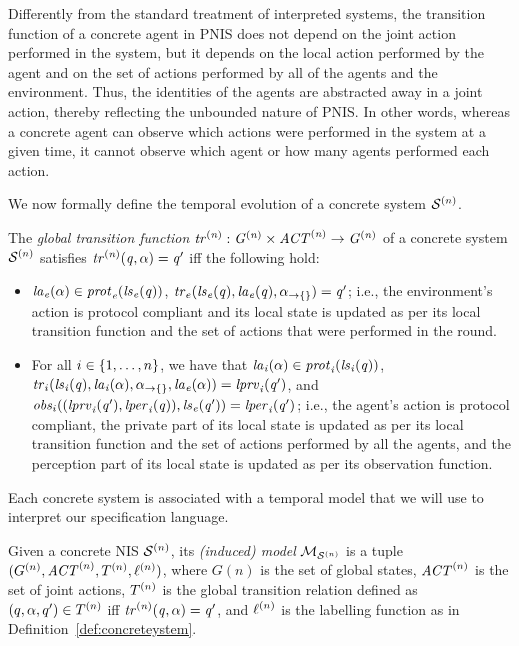 Differently from the standard treatment of interpreted systems, the
transition function of a concrete agent in PNIS  does not depend on the joint
action performed in the system, but it depends on the local action performed by
the  agent and on the set of actions performed by all of the agents
and the environment.  Thus, the identities of the agents are abstracted away in
a joint action, thereby reflecting the unbounded nature of PNIS. In other words,
whereas  a concrete agent can observe which actions were performed in the system
at a given time,  it cannot observe which agent or how many agents performed
each action.

We now formally define the temporal evolution of a concrete system
$\mathcal{S}^{(n)}$.



\begin{definition} 
  \label{def:globaltransition}
  The {\em global transition function} $\it{tr}^{(n)} : G^{(n)}
  \times \mathit{ACT}^{(n)} \rightarrow G^{(n)}$ of a concrete system $\mathcal{S}^{(n)}$
  satisfies $\it{tr}^{(n)}(q, \alpha) = q'$ iff the following hold:
  \begin{itemize}[$\bullet$]
  \item $\it{la}_{e}({\alpha}) \in \mathit{prot}_{e}({\it{ls}_{e}(q)})$, $\mathit{tr}_{e}(\it{ls}_{e}(q),
  \it{la}_{e}({q}), \alpha_{\rightarrow\{\}}) = q'$; i.e., the environment’s action is
  protocol compliant and its local state is updated as per its local transition
  function and the set of actions that were performed in the round.

  \item For all $i \in \left \{ 1,\ldots,n \right \}$, we have that $\it{la}_{i}({\alpha}) \in
  \mathit{prot}_{i}(\it{ls}_{i}(q))$, $\mathit{tr}_{i} (\it{ls}_{i}(q), \it{la}_{i}({\alpha}),
  \alpha_{\rightarrow\{\}}, \it{la}_{e}({\alpha})) = \it{lprv}_{i}(q')$, and $\mathit{obs}_{i}((\it{lprv}_{i}(q'),\it{lper}_{i}(q)),\it{ls}_{e}(q')) = \it{lper}_{i}(q')$; i.e., the agent's
  action is protocol compliant, the private part of its local state is updated
  as per its local transition function and the set of actions performed by
  all the agents, and the perception part of its local state is updated as per
  its observation function.
  \end{itemize}
\end{definition}


Each concrete system is associated with a temporal model 
that we will use  to interpret our specification language.

\begin{definition}[Model]
  \label{def:model}
  Given a concrete NIS $\mathcal{S}^{(n)}$, its \emph{(induced) model} $\mathcal{M}_{\mathcal{S}^{(n)}}$ is a
  tuple $(G^{(n)}, \mathit{ACT}^{(n)}, T^{(n)}, \ell^{(n)})$,
  where $G(n)$ is the set of global states, $\mathit{ACT}^{(n)}$ is the set
  of joint actions, $T^{(n)}$ is the global transition relation defined as
  $(q, \alpha, q') \in T^{(n)}$ iff $\it{tr}^{(n)}(q, \alpha) = q'$, and
  $\ell^{(n)}$ is the labelling function as in
  Definition~\ref{def:concreteystem}.
\end{definition}

